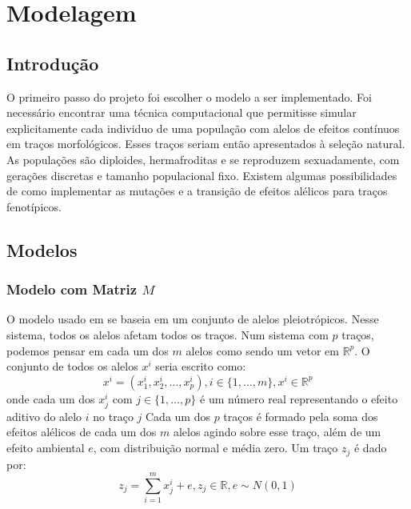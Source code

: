 \pagestyle{empty}
\cleardoublepage
\pagestyle{fancy}
\chapter{Modelagem}\label{cap2}

\section{Introdução}\label{cap2:intro}

O primeiro passo do projeto foi escolher o modelo a ser implementado.
Foi necessário encontrar uma técnica computacional que permitisse
simular explicitamente cada individuo de uma população com alelos de efeitos
contínuos em traços morfológicos. 
Esses traços seriam então apresentados à seleção natural.
As populações são diploides, hermafroditas e se reproduzem sexuadamente,
com gerações discretas e tamanho populacional fixo.
Existem algumas possibilidades de como implementar as mutações e
a transição de efeitos alélicos para traços fenotípicos.

\section{Modelos}\label{cap2:mem}

\subsection{Modelo com Matriz $M$}\label{cap2:mem:ModelM}

O modelo usado em \cite{Jones2003, Jones2004, Jones2007} se baseia em um
conjunto de alelos pleiotrópicos.
Nesse sistema, todos os alelos afetam todos os traços.
Num sistema com $p$ traços, podemos pensar em cada um
dos $m$ alelos como sendo um vetor em $\mathbb{R}^p$.
O conjunto de todos os alelos $x^i$ seria escrito como:
\begin{equation}
x^i = ( x^i_1, x^i_2,\ldots, x^i_p), i \in \{1,\ldots, m\}, x^i \in \mathbb{R}^p
\end{equation}
onde cada um dos $x^i_j$ com $j \in \{1,\ldots, p\}$ é um número real
representando o efeito aditivo do alelo $i$ no traço $j$
Cada um dos
$p$ traços é formado pela soma dos efeitos alélicos de cada um dos
$m$ alelos agindo sobre esse traço, além de um efeito ambiental $e$, com
distribuição normal e média zero.
Um traço $z_j$ é dado
por:
\begin{equation}
z_j = \sum_{i=1}^m x^i_j + e, z_j \in \mathbb{R}, e \sim N(0, 1)
\end{equation}

